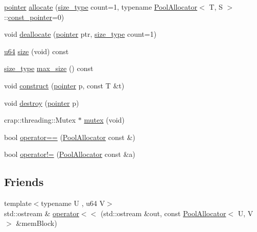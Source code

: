 \begin{DoxyCompactItemize}
\item 
\hyperlink{classcrap_1_1memory_1_1_pool_allocator_a4de0cc524be4b7f4fd16c1ac54383c71}{pointer} \hyperlink{classcrap_1_1memory_1_1_pool_allocator_a48464b954fb768aae9ce6e9e63d5b322}{allocate} (\hyperlink{classcrap_1_1memory_1_1_pool_allocator_a867ec9bb97be57d8fdae439d38b6ea68}{size\-\_\-type} count=1, typename \hyperlink{classcrap_1_1memory_1_1_pool_allocator}{Pool\-Allocator}$<$ T, S $>$\-::\hyperlink{classcrap_1_1memory_1_1_pool_allocator_afb622f1279d38037c15d9d4edfcf8b73}{const\-\_\-pointer}=0)
\item 
void \hyperlink{classcrap_1_1memory_1_1_pool_allocator_aeedfdb726397d15088e523c647cb3b47}{deallocate} (\hyperlink{classcrap_1_1memory_1_1_pool_allocator_a4de0cc524be4b7f4fd16c1ac54383c71}{pointer} ptr, \hyperlink{classcrap_1_1memory_1_1_pool_allocator_a867ec9bb97be57d8fdae439d38b6ea68}{size\-\_\-type} count=1)
\item 
\hyperlink{types_8h_a3f7e2bcbb0b4c338f3c4f6c937cd4234}{u64} \hyperlink{classcrap_1_1memory_1_1_pool_allocator_a5f25ccf4c1495df81555c7b73987d9c4}{size} (void) const 
\item 
\hyperlink{classcrap_1_1memory_1_1_pool_allocator_a867ec9bb97be57d8fdae439d38b6ea68}{size\-\_\-type} \hyperlink{classcrap_1_1memory_1_1_pool_allocator_ac844ab857f2cc5dd0d323988ae40f85b}{max\-\_\-size} () const 
\item 
void \hyperlink{classcrap_1_1memory_1_1_pool_allocator_a0abe958017daa42b7c049f05eb62bd86}{construct} (\hyperlink{classcrap_1_1memory_1_1_pool_allocator_a4de0cc524be4b7f4fd16c1ac54383c71}{pointer} p, const T \&t)
\item 
void \hyperlink{classcrap_1_1memory_1_1_pool_allocator_a86f3b664ebd6354f57acd43e781a6c06}{destroy} (\hyperlink{classcrap_1_1memory_1_1_pool_allocator_a4de0cc524be4b7f4fd16c1ac54383c71}{pointer} p)
\item 
crap\-::threading\-::\-Mutex $\ast$ \hyperlink{classcrap_1_1memory_1_1_pool_allocator_ab37126a57c2e7d42b561e0c9a876e7a0}{mutex} (void)
\item 
bool \hyperlink{classcrap_1_1memory_1_1_pool_allocator_a250dd1217ac2ac336efb5f561ab180a7}{operator==} (\hyperlink{classcrap_1_1memory_1_1_pool_allocator}{Pool\-Allocator} const \&)
\item 
bool \hyperlink{classcrap_1_1memory_1_1_pool_allocator_aaf77ac61eafdca76820b98b4bc78a8d1}{operator!=} (\hyperlink{classcrap_1_1memory_1_1_pool_allocator}{Pool\-Allocator} const \&a)
\end{DoxyCompactItemize}
\subsection*{Friends}
\begin{DoxyCompactItemize}
\item 
{\footnotesize template$<$typename U , u64 V$>$ }\\std\-::ostream \& \hyperlink{classcrap_1_1memory_1_1_pool_allocator_ab97c042860d04ffbfb900e26696b671c}{operator$<$$<$} (std\-::ostream \&out, const \hyperlink{classcrap_1_1memory_1_1_pool_allocator}{Pool\-Allocator}$<$ U, V $>$ \&mem\-Block)
\end{DoxyCompactItemize}


